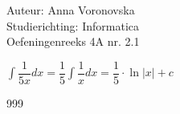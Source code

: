 \documentclass[a4paper]{article}
\begin{document}
\noindent \large Auteur: Anna Voronovska \\
\noindent \large Studierichting: Informatica \\
\noindent \large Oefeningenreeks 4A nr. 2.1 \\

\medskip

\normalsize

 
$\displaystyle\int \dfrac{1}{5x} dx = \dfrac{1}{5} \displaystyle\int \dfrac{1}{x} dx = \dfrac{1}{5} \cdot \ln|x| + c$

\begin{thebibliography}{999}
\end{thebibliography}
\end{document}
